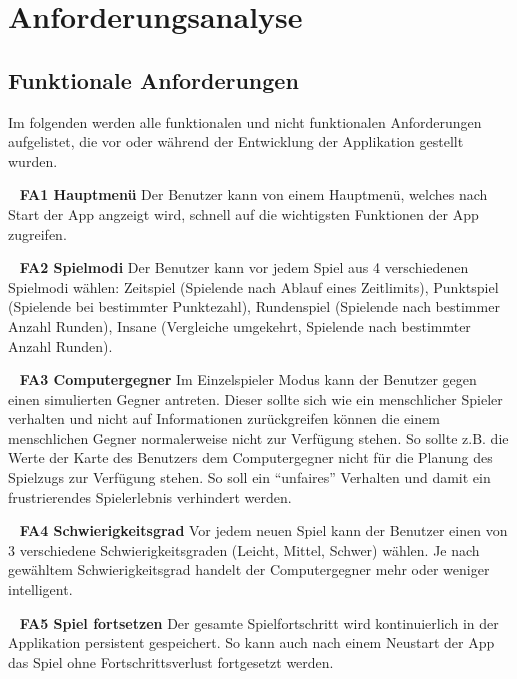 \documentclass{scrartcl}
\begin{document}
\textbf{}

\section{Anforderungsanalyse}
\subsection{Funktionale Anforderungen}

Im folgenden werden alle funktionalen und nicht funktionalen Anforderungen
aufgelistet, die vor oder während der Entwicklung der Applikation gestellt wurden.

\ \newline
\textbf{FA1 Hauptmenü} \newline
Der Benutzer kann von einem Hauptmenü, welches nach Start der App angzeigt wird,
schnell auf die wichtigsten Funktionen der App zugreifen.

\ \newline
\textbf{FA2 Spielmodi} \newline
Der Benutzer kann vor jedem Spiel aus 4 verschiedenen Spielmodi wählen: Zeitspiel
(Spielende nach Ablauf eines Zeitlimits), Punktspiel (Spielende bei bestimmter
Punktezahl), Rundenspiel (Spielende nach bestimmer Anzahl Runden), Insane
(Vergleiche umgekehrt, Spielende nach bestimmter Anzahl Runden).

\ \newline
\textbf{FA3 Computergegner} \newline
Im Einzelspieler Modus kann der Benutzer gegen einen simulierten Gegner antreten.
Dieser sollte sich wie ein menschlicher Spieler verhalten und nicht auf
Informationen zurückgreifen können die einem menschlichen Gegner normalerweise
nicht zur Verfügung stehen. So sollte z.B. die Werte der Karte des Benutzers dem
Computergegner nicht für die Planung des Spielzugs zur Verfügung stehen. So soll
ein \enquote{unfaires} Verhalten und damit ein frustrierendes Spielerlebnis
verhindert werden.

\ \newline
\textbf{FA4 Schwierigkeitsgrad} \newline
Vor jedem neuen Spiel kann der Benutzer einen von 3 verschiedene
Schwierigkeitsgraden (Leicht, Mittel, Schwer) wählen. Je nach gewähltem
Schwierigkeitsgrad handelt der Computergegner mehr oder weniger intelligent.

\ \newline
\textbf{FA5 Spiel fortsetzen} \newline
Der gesamte Spielfortschritt wird kontinuierlich in der Applikation persistent
gespeichert. So kann auch nach einem Neustart der App das Spiel ohne
Fortschrittsverlust fortgesetzt werden.
\end{document}
